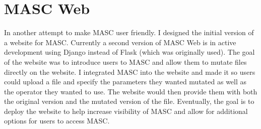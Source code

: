 \section{MASC Web}
\label{ch3:subsec:web}

In another attempt to make MASC user friendly. I designed the initial version of a website for MASC. Currently a second version of MASC Web is in active development using Django instead of Flask (which was originally used). The goal of the website was to introduce users to MASC and allow them to mutate files directly on the website. I integrated MASC into the website and made it so users could upload a file and specify the parameters they wanted mutated as well as the operator they wanted to use. The website would then provide them with both the original version and the mutated version of the file. Eventually, the goal is to deploy the website to help increase visibility of MASC and allow for additional options for users to access MASC.

